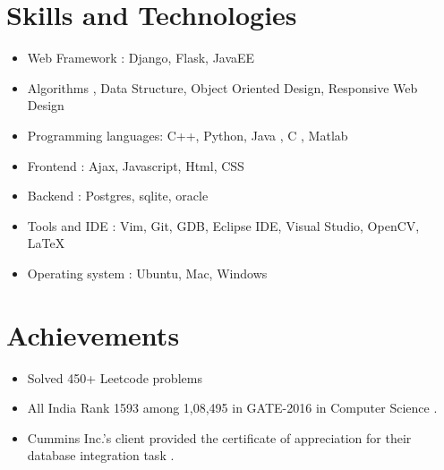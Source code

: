 \documentclass[a4paper,10pt]{article}
\begin{document}
	\section{Skills and Technologies}
	\begin{itemize}
		\item Web Framework : Django, Flask, JavaEE
		\item Algorithms , Data Structure, Object Oriented Design, Responsive Web Design
        		\item Programming languages: C++, Python, Java , C , Matlab 
		\item Frontend : Ajax, Javascript, Html, CSS
		\item Backend : Postgres, sqlite, oracle
	    	\item Tools and IDE : Vim, Git, GDB, Eclipse IDE, Visual Studio, OpenCV, {\LaTeX}
		\item Operating system : Ubuntu, Mac, Windows
	\end{itemize}
	
	\section{Achievements}
	\begin{itemize}
		\item Solved 450+ Leetcode problems
		\item All India Rank 1593 among 1,08,495  in GATE-2016 in Computer Science .
                \item Cummins Inc.’s client provided the certificate of appreciation for their database integration task .
	\end{itemize}
\end{document}
